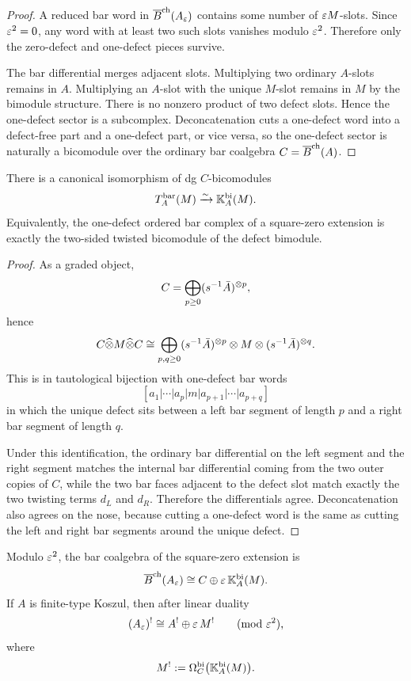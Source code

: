 \begin{proof}
A reduced bar word in $\overline{B}^{\mathrm{ch}}(A_\varepsilon)$ contains some number of $\varepsilon M$-slots.
Since $\varepsilon^2=0$, any word with at least two such slots vanishes modulo $\varepsilon^2$.
Therefore only the zero-defect and one-defect pieces survive.

The bar differential merges adjacent slots. Multiplying two ordinary $A$-slots remains in $A$.
Multiplying an $A$-slot with the unique $M$-slot remains in $M$ by the bimodule structure.
There is no nonzero product of two defect slots. Hence the one-defect sector is a subcomplex.
Deconcatenation cuts a one-defect word into a defect-free part and a one-defect part, or vice versa,
so the one-defect sector is naturally a bicomodule over the ordinary bar coalgebra $C=\overline{B}^{\mathrm{ch}}(A)$.
\end{proof}

\begin{theorem}
\ClaimStatusProvedHere
\label{thm:tangent=K}
There is a canonical isomorphism of dg $C$-bicomodules
\[
T_A^{\mathrm{bar}}(M)\xrightarrow{\sim}\mathbb{K}_A^{\mathrm{bi}}(M).
\]
Equivalently, the one-defect ordered bar complex of a square-zero extension is exactly the two-sided
twisted bicomodule of the defect bimodule.
\end{theorem}

\begin{proof}
As a graded object,
\[
C=\bigoplus_{p\geq 0} (s^{-1}\bar A)^{\otimes p},
\]
hence
\[
C\widehat\otimes M\widehat\otimes C
\cong
\bigoplus_{p,q\geq 0}
(s^{-1}\bar A)^{\otimes p}\otimes M\otimes(s^{-1}\bar A)^{\otimes q}.
\]
This is in tautological bijection with one-defect bar words
\[
[a_1|\cdots|a_p|m|a_{p+1}|\cdots|a_{p+q}]
\]
in which the unique defect sits between a left bar segment of length $p$ and a right bar segment of
length $q$.

Under this identification, the ordinary bar differential on the left segment and the right segment
matches the internal bar differential coming from the two outer copies of $C$, while the two bar
faces adjacent to the defect slot match exactly the two twisting terms $d_L$ and $d_R$.
Therefore the differentials agree. Deconcatenation also agrees on the nose, because cutting a
one-defect word is the same as cutting the left and right bar segments around the unique defect.
\end{proof}

\begin{corollary}
\ClaimStatusProvedHere
\label{cor:infdual}
Modulo $\varepsilon^2$, the bar coalgebra of the square-zero extension is
\[
\overline{B}^{\mathrm{ch}}(A_\varepsilon)\cong C\oplus \varepsilon\,\mathbb{K}_A^{\mathrm{bi}}(M).
\]
If $A$ is finite-type Koszul, then after linear duality
\[
(A_\varepsilon)^!\cong A^!\oplus \varepsilon\, M^!
\qquad (\mathrm{mod}\ \varepsilon^2),
\]
where
\[
M^!:=\Omega_C^{\mathrm{bi}}\bigl(\mathbb{K}_A^{\mathrm{bi}}(M)\bigr).
\]
\end{corollary}


